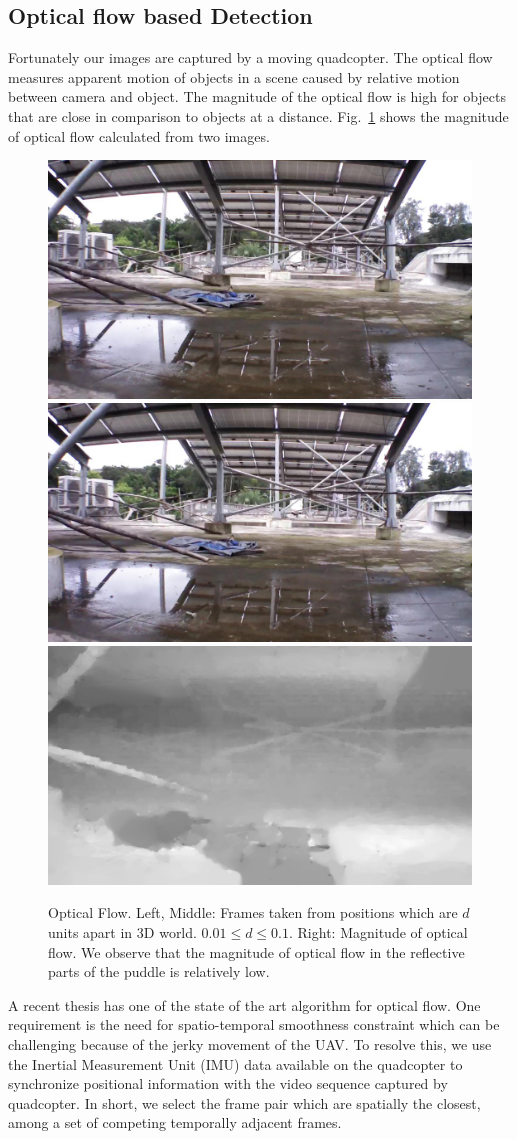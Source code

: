 \documentclass[times,10pt,twocolumn]{article}
\begin{document}
\subsection{Optical flow based Detection}
Fortunately our images are captured by a moving quadcopter.  The
optical flow measures apparent motion of objects in a scene caused by
relative motion between camera and object. The magnitude of the
optical flow is high for objects that are close in comparison to
objects at a distance.  Fig.~\ref{fig:optical_flow} shows the
magnitude of optical flow calculated from two images.

\begin{figure}[h!]
  \centering
  \includegraphics[width=0.32\linewidth]{images/IMG_PAIR_27_1} \hfill
  \includegraphics[width=0.32\linewidth]{images/IMG_PAIR_27_2} \hfill
  \includegraphics[width=0.32\linewidth]{images/IMG_PAIR_27_optical_flow}
  \caption{Optical Flow. Left, Middle: Frames taken from positions
    which are $d$ units apart in 3D world. $ 0.01 \leq d \leq 0.1$. Right:
    Magnitude of optical flow. We observe that the magnitude of optical
    flow in the reflective parts of the puddle is relatively low.}
  \label{fig:optical_flow}
\end{figure}

A recent thesis \cite{Liu11Thesis} has one of the state of the art
algorithm for optical flow. One requirement is the need for
spatio-temporal smoothness constraint which can be challenging because
of the jerky movement of the UAV.  To resolve this, we use the
Inertial Measurement Unit (IMU) data available on the quadcopter to
synchronize positional information with the video sequence captured by
quadcopter. In short, we select the frame pair which are spatially the
closest, among a set of competing temporally adjacent frames.
\end{document}
